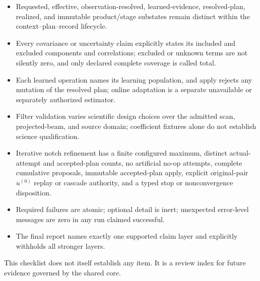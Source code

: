 \documentclass[10pt]{article}
\begin{document}
\begin{itemize}
      response, support, unit, validity, uncertainty, and provenance are bound.
\item Requested, effective, observation-resolved, learned-evidence,
      resolved-plan, realized, and immutable product/stage substates remain
      distinct within the context--plan--record lifecycle.
\item Every covariance or uncertainty claim explicitly states its included and
      excluded components and correlations; excluded or unknown terms are not
      silently zero, and only declared complete coverage is called total.
\item Each learned operation names its learning population, and apply rejects
      any mutation of the resolved plan; online adaptation is a separate
      unavailable or separately authorized estimator.
\item Filter validation varies scientific design choices over the admitted
      scan, projected-beam, and source domain; coefficient fixtures alone do
      not establish science qualification.
\item Iterative notch refinement has a finite configured maximum, distinct
      actual-attempt and accepted-plan counts, no artificial no-op attempts,
      complete cumulative proposals, immutable
      accepted-plan apply, explicit original-pair $u^{(0)}$ replay or cascade authority,
      and a typed stop or nonconvergence disposition.
\item Required failures are atomic; optional detail is inert; unexpected
      error-level messages are zero in any run claimed successful.
\item The final report names exactly one supported claim layer and explicitly
      withholds all stronger layers.
\end{itemize}

This checklist does not itself establish any item.  It is a review index for
future evidence governed by the shared core.
\end{document}
